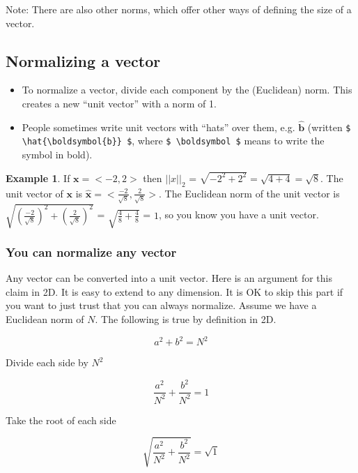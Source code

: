 \documentclass[]{article}
\theoremstyle{definition}
\newtheorem{exmp}{Example}[section]
\begin{document}
\noindent Note: There are also other norms, which offer other ways of defining the size of a vector.

\subsection{Normalizing a vector}

\begin{itemize}
\item To normalize a vector, divide each component by the (Euclidean) norm. This creates a new ``unit vector'' with a norm of 1. 
\item People sometimes write unit vectors with ``hats'' over them, e.g.  $\hat{\bm{b}}$ (written \verb|$ \hat{\boldsymbol{b}} $|, where \verb|$ \boldsymbol $| means to write the symbol in bold).
\end{itemize}

\begin{exmp}
If $ \mathbf{x}=<-2,2> $ then  $\vert \vert x \vert \vert_2$ = $\sqrt{-2^2 + 2^2} = \sqrt{4 + 4}  = \sqrt{8}$. The unit vector of $ \mathbf{x}$ is $ \mathbf{\hat{x}}=<\frac{-2}{\sqrt{8}},\frac{2}{\sqrt{8}}> $. The Euclidean norm of the unit vector is $\sqrt{(\frac{-2}{\sqrt{8}})^2 + (\frac{2}{\sqrt{8}})^2}$ = $\sqrt{\frac{4}{8} + \frac{4}{8}}$ = $1$, so you know you have a unit vector. 
\end{exmp}

\subsubsection{You can normalize any vector}
Any vector can be converted into a unit vector. Here is an argument for this claim in 2D. It is easy to extend to any dimension. It is OK to skip this part if you want to just trust that you can always normalize. Assume we have a Euclidean norm of $N$. The following is true by definition in 2D.

\begin{equation}
a^2 + b^2 = N^2 
\end{equation}

Divide each side by $N^2$

\begin{equation}
\frac{a^2}{N^2} + \frac{b^2}{N^2} = 1
\end{equation}

Take the root of each side

\begin{equation}
\sqrt{\frac{a^2}{N^2} + \frac{b^2}{N^2}} = \sqrt{1}
\end{equation}
\end{document}

